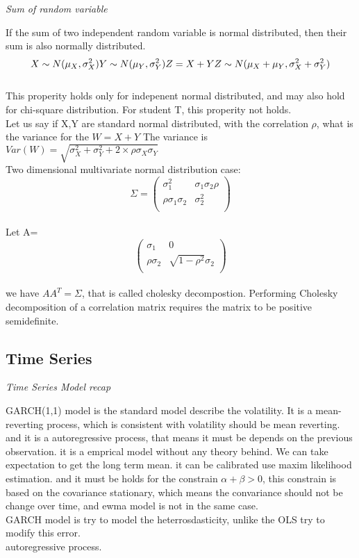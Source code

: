 \documentclass[a4paper,11pt]{article}
\begin{document}
\begin{centering}
\em {Sum of random variable\\}
\end{centering}
If the sum of two independent random variable is normal distributed, then their sum is also normally distributed.
$$
X\sim N(\mu_X,\sigma^2_X) \\
Y\sim N(\mu_Y,\sigma^2_Y)\\
Z=X+Y\\
Z \sim N(\mu_X+\mu_Y,\sigma^2_X+\sigma^2_Y)
$$\\
This properity holds only for indepenent normal distributed, and may also hold for chi-square distribution. For student T, this properity not holds.\\
Let us say if X,Y are standard normal distributed, with the correlation $\rho$, what is the variance for the $W=X+Y$
The variance is $Var(W)=\sqrt{\sigma_X^2+\sigma_Y^2+2\times\rho\sigma_X\sigma_Y}$\\
Two dimensional multivariate normal distribution case:\\
$$ \Sigma=
\begin{pmatrix}
  \sigma_1^2 & \sigma_1\sigma_2\rho  \\
  \rho\sigma_1\sigma_2  &\sigma_2^2    \\
 \end{pmatrix}$$\\
 Let
 A=
 $$
 \begin{pmatrix}
 \sigma_1 & 0     \\
 \rho\sigma_2 & \sqrt{1-\rho^2}\sigma_2\\
 \end{pmatrix} $$\\
 we have $AA^T=\Sigma$, that is called cholesky decompostion. Performing Cholesky decomposition of a correlation matrix requires the matrix to be positive semidefinite.

\subsection{Time Series}
\begin{centering}
\em {Time Series Model recap\\}
\end{centering}
GARCH(1,1) model is the standard model describe the volatility. It is a mean-reverting process, which is consistent with volatility should be mean reverting. and it is a autoregressive process, that means it must be depends on the previous observation. it is a emprical model without any theory behind. We can take expectation to get the long term mean. it can be calibrated use maxim likelihood estimation. and it must be holds for the constrain $\alpha + \beta >0$, this constrain is based on the covariance stationary, which means the convariance should not be change over time, and ewma model is not in the same case.\\
GARCH model is try to model the heterrosdasticity, unlike the OLS try to modify this error. \\
autoregressive process.\\
\end{document}
